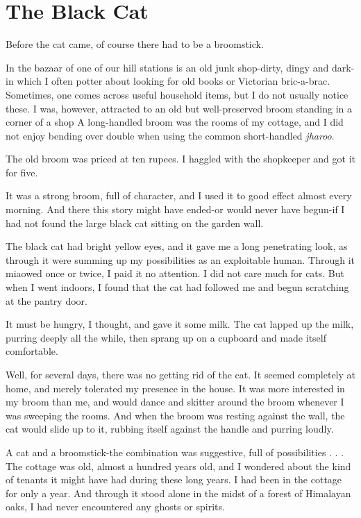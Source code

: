 \chapter{The Black Cat}
Before the cat came, of course there had to be a broomstick.
\par
In the bazaar of one of our hill stations is an old junk shop-dirty, dingy and dark-in which I often potter about looking for old books or Victorian bric-a-brac. Sometimes, one comes across useful household items, but I do not usually notice these. I was, however, attracted to an old but well-preserved broom standing in a corner of a shop A long-handled broom was the rooms of my cottage, and I did not enjoy bending over double when using the common short-handled \textit{jharoo}.
\par
The old broom was priced at ten rupees. I haggled with the shopkeeper and got it for five.
\par
It was a strong broom, full of character, and I used it to good effect almost every morning. And there this story might have ended-or would never have begun-if I had not found the large black cat sitting on the garden wall.
\par
The black cat had bright yellow eyes, and it gave me a long penetrating look, as through it were summing up my possibilities as an exploitable human. Through it miaowed once or twice, I paid it no attention. I did not care much for cats. But when I went indoors, I found that the cat had followed me and begun scratching at the pantry door.
\par
It must be hungry, I thought, and gave it some milk. The cat lapped up the milk, purring deeply all the while, then sprang up on a cupboard and made itself comfortable.
\par
Well, for several days, there was no getting rid of the cat. It seemed completely at home, and merely tolerated my presence in the house. It was more interested in my broom than me, and would dance and skitter around the broom whenever I was sweeping the rooms. And when the broom was resting against the wall, the cat would slide up to it, rubbing itself against the handle and purring loudly.
\par
A cat and a broomstick-the combination was suggestive, full of possibilities . . . The cottage was old, almost a hundred years old, and I wondered about the kind of tenants it might have had during these long years. I had been in the cottage for only a year. And through it stood alone in the midst of a forest of Himalayan oaks, I had never encountered any ghosts or spirits.

